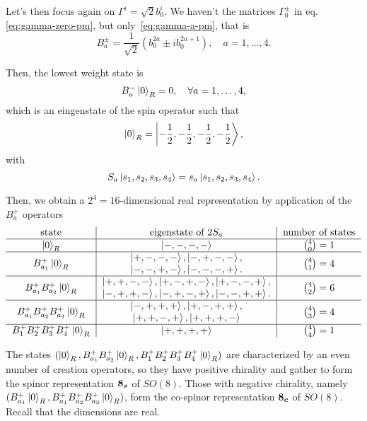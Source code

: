 Let's then focus again on $\Gamma^i = \sqrt{2}b^i_0$. We haven't the matrices $\Gamma^\pm_0$ in eq.\eqref{eq:gamma-zero-pm}, but only~\eqref{eq:gamma-a-pm}, that is
\begin{equation}
    B^\pm_a = \frac{1}{\sqrt{2}} \left( b^{2a}_0 \pm i b^{2a+1}_0 \right), \quad a = 1, \dots, 4.
\end{equation}

Then, the lowest weight state is
\begin{equation}
    B^-_a\ket{0}_{R} = 0, \quad \forall a = 1, \dots, 4,
\end{equation}
which is an eingenstate of the spin operator such that
\begin{equation}
    \ket{0}_{R} = \ket{-\frac{1}{2},-\frac{1}{2},-\frac{1}{2},-\frac{1}{2}},
\end{equation}
with
\begin{equation}
    S_a \ket{s_1,s_2,s_3,s_4} = s_a \ket{s_1,s_2,s_3,s_4}.
\end{equation}

Then, we obtain a $2^4 = 16$-dimensional real representation by application of the $B^+_a$ operators
\begin{equation*}
    \begin{tabular}{c|c|c}
        state & eigenstate of $2S_a$ & number of states \\ \hline
        $\ket{0}_{R}$ & $\ket{-,-,-,-}$ & $\binom{4}{0} = 1$ \\ \hline
        \multirow{2}{*}{$B^+_{a_1} \ket{0}_{R}$} & $\ket{+,-,-,-}, \ket{-,+,-,-},$ & \multirow{2}{*}{$\binom{4}{1} = 4$} \\ 
        & $\ket{-,-,+,-}, \ket{-,-,-,+}.$ & \\ \hline
        \multirow{2}{*}{$B^+_{a_1}B^+_{a_2}\ket{0}_{R}$} & $\ket{+,+,-,-}, \ket{+,-,+,-}, \ket{+,-,-,+},$ & \multirow{2}{*}{$\binom{4}{2} = 6$} \\ 
        & $\ket{-,+,+,-}, \ket{-,+,-,+}, \ket{-,-,+,+}.$ & \\ \hline
        \multirow{2}{*}{$B^+_{a_1}B^+_{a_2}B^+_{a_3} \ket{0}_{R}$} & $\ket{-,+,+,+}, \ket{+,-,+,+},$ & \multirow{2}{*}{$\binom{4}{3} = 4$} \\ 
        & $\ket{+,+,-,+}, \ket{+,+,+,-}$ & \\ \hline
        $B^+_{1}B^+_{2}B^+_{3}B^+_{4} \ket{0}_{R}$ & $\ket{+,+,+,+}$ & $\binom{4}{4} = 1$
    \end{tabular}
\end{equation*}

The states $(\ket{0}_{R}, B^+_{a_1}B^+_{a_2}\ket{0}_{R},B^+_{1}B^+_{2}B^+_{3}B^+_{4} \ket{0}_{R})$ are characterized by an even number of creation operators, so they have positive chirality and gather to form the spinor representation $\boldsymbol{8_s}$ of $SO(8)$. Those with negative chirality, namely $(B^+_{a_1} \ket{0}_{R}, B^+_{a_1}B^+_{a_2}B^+_{a_3}\ket{0}_{R})$, form the co-spinor representation $\boldsymbol{8_c}$ of $SO(8)$. Recall that the dimensions are real.

